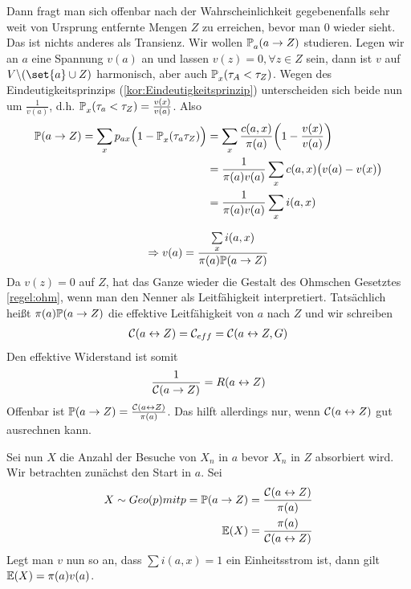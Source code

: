 Dann fragt man sich offenbar nach der Wahrscheinlichkeit gegebenenfalls sehr weit von Ursprung entfernte Mengen $Z$ zu erreichen, bevor man $0$ wieder sieht. Das ist nichts anderes als Transienz. Wir wollen $\propE{a \to Z}[][a]$ studieren. Legen wir an $a$ eine Spannung $v(a)$ an und lassen $v(z) = 0, \forall z \in Z$ sein, dann ist $v$ auf $V \backslash(\set{a}\cup Z)$ harmonisch, aber auch $\propE{\tau_A < \tau_Z}[][x]$. Wegen des Eindeutigkeitsprinzips (\ref{kor:Eindeutigkeitsprinzip}) unterscheiden sich beide nun um $\frac{1}{v(a)}$, d.h. $\prop{\tau_a < \tau_Z}[][x] = \frac{v(x)}{v(a)}$. Also
\begin{align}
	\prop{a \to Z} = \sum\limits_{x}p_{ax} \Big(1-\prop{\tau_a \tau_Z}[][x] \Big) &= \sum\limits_{x}\frac{c(a,x)}{\pi(a)}\enb{1-\frac{v(x)}{v(a)}} \\
	&= \frac{1}{\pi(a)v(a)}\sum\limits_{x}c(a,x)\big(v(a)-v(x) \big) \\
	&= \frac{1}{\pi(a)v(a)}\sum\limits_{x}i(a,x)
\end{align}

\begin{align}
	\Rightarrow v(a) = \frac{\sum\limits_{x}i(a,x)}{\pi(a)\prop{a \to Z}}
\end{align}
Da $v(z) = 0$ auf $Z$, hat das Ganze wieder die Gestalt des Ohmschen Gesetztes \ref{regel:ohm}, wenn man den Nenner als Leitfähigkeit interpretiert. Tatsächlich heißt $\pi(a)\prop{a \to Z}$ die effektive Leitfähigkeit von $a$ nach $Z$ und wir schreiben
\begin{align} 
	\leit{a \leftrightarrow Z} = \mathcal{C}_{eff}  = \leit{a\leftrightarrow Z,G}
\end{align}
Den effektive Widerstand ist somit 
\begin{align}
	\frac{1}{\leit{a \to Z}} = R(a \leftrightarrow Z)
\end{align}
Offenbar ist $\prop{a\to Z} = \frac{\leit{a \leftrightarrow Z}}{\pi(a)}$. Das hilft allerdings nur, wenn $\leit{a \leftrightarrow Z}$ gut ausrechnen kann. 

Sei nun $X$ die Anzahl der Besuche von $X_n$ in $a$ bevor $X_n$ in $Z$ absorbiert wird. Wir betrachten zunächst den Start in $a$. Sei 
\begin{align}
	X \sim Geo(p) mit p= \prop{a \to Z} = \frac{\leit{a \leftrightarrow Z}}{\pi(a)} \\
	\EW{X} = \frac{\pi(a)}{\leit{a \leftrightarrow  Z}}
\end{align}
Legt man $v$ nun so an, dass $\sum i(a,x) = 1$ ein Einheitsstrom ist, dann gilt $\EW{X} = \pi(a)v(a)$.

